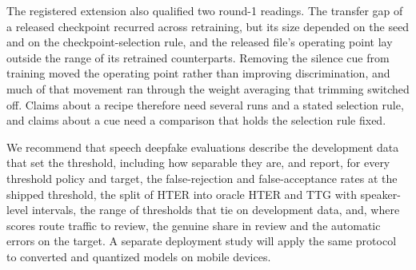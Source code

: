 \documentclass[review,authoryear]{elsarticle}
\begin{document}
The registered extension also qualified two round-1 readings. The transfer gap of a released checkpoint recurred across
retraining, but its size depended on the seed and on the checkpoint-selection rule, and the released file's operating
point lay outside the range of its retrained counterparts. Removing the silence cue from training moved the operating
point rather than improving discrimination, and much of that movement ran through the weight averaging that trimming
switched off. Claims about a recipe therefore need several runs and a stated selection rule, and claims about a cue need
a comparison that holds the selection rule fixed.

We recommend that speech deepfake evaluations describe the development data that set the threshold, including how
separable they are, and report, for every threshold policy and target, the false-rejection and false-acceptance rates at
the shipped threshold, the split of HTER into oracle HTER and TTG with speaker-level intervals, the range of thresholds
that tie on development data, and, where scores route traffic to review, the genuine share in review and the automatic
errors on the target. A separate deployment study will apply the same protocol to converted and
quantized models on mobile devices.





\end{document}

